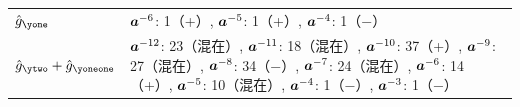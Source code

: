 \begin{center}
\begin{tabular}{lp{11.5cm}}
\toprule
$\hat g_{\yone}$ & $\bm{a}^{-6}$: 1（+）, $\bm{a}^{-5}$: 1（+）, $\bm{a}^{-4}$: 1（−） \\
$\hat g_{\ytwo} + \hat g_{\yoneone}$ & $\bm{a}^{-12}$: 23（混在）, $\bm{a}^{-11}$: 18（混在）, $\bm{a}^{-10}$: 37（+）, $\bm{a}^{-9}$: 27（混在）, $\bm{a}^{-8}$: 34（−）, $\bm{a}^{-7}$: 24（混在）, $\bm{a}^{-6}$: 14（+）, $\bm{a}^{-5}$: 10（混在）, $\bm{a}^{-4}$: 1（−）, $\bm{a}^{-3}$: 1（−） \\
\bottomrule
\end{tabular}
\end{center}

